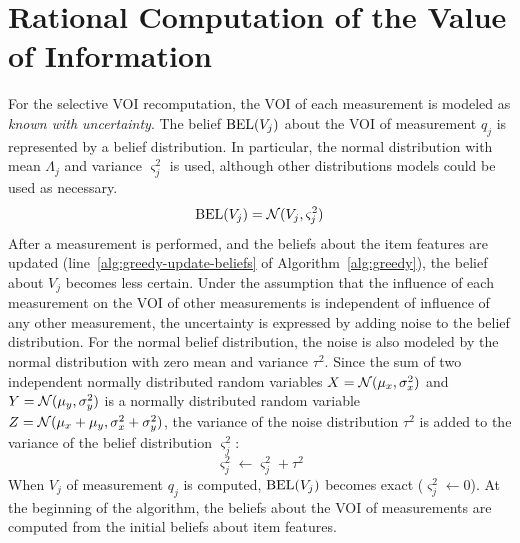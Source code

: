 \section{Rational Computation of the Value of Information}
\label{sec:raticomp-rational}

For the selective VOI recomputation, the VOI of each
measurement is modeled as {\em known with uncertainty}. The belief
$\mathop{\mathrm{BEL}}(V_j)$ about the VOI
of measurement $q_j$ is represented by a belief distribution. In
particular, the normal distribution with mean $\Lambda_j$ and variance
$\varsigma_j^2$ is used, although other distributions
models could be used as necessary.
\begin{equation}
\mathop{\mathrm{BEL}}(V_j)=\mathcal{N}(V_j, \varsigma_j^2)
\end{equation}
After a measurement is performed, and the beliefs about the item
features are updated
(line~\ref{alg:greedy-update-beliefs} of
Algorithm~\ref{alg:greedy}), the belief about $V_j$ becomes less
certain. Under the assumption that the influence of each measurement
on the VOI of other measurements is independent of
influence of any other measurement, the uncertainty is expressed by
adding noise to the belief distribution. For the normal
belief distribution, the noise is also modeled by the normal
distribution with zero mean and variance $\tau^2$. Since the sum of
two independent normally distributed random variables $X=\mathcal{N}(\mu_x,
\sigma^2_x)$ and $Y=\mathcal{N}(\mu_y, \sigma^2_y)$ is a normally distributed
random variable $Z=\mathcal{N}(\mu_x+\mu_y, \sigma^2_x+\sigma^2_y)$,
the variance of the noise distribution $\tau^2$ is added
to the variance of the belief distribution $\varsigma_j^2$:
\begin{equation}
\varsigma_j^2 \leftarrow \varsigma_j^2+\tau^2
\label{eq:varsigma}
\end{equation}
When $V_j$ of measurement $q_j$ is computed, $\mathop{\mathrm{BEL}}(V_j)$
becomes exact ($\varsigma_j^2 \leftarrow 0$). At the beginning of the
algorithm, the beliefs about the VOI of
measurements are computed from the initial beliefs about item
features.

